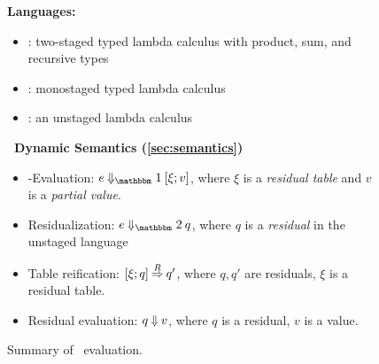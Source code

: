 
\begin{figure*}
\textbf{Languages:}
\begin{itemize}
\item \lang: two-staged typed lambda calculus with product, sum, and
  recursive types
\item \langTwo: monostaged typed lambda calculus
\item \langmono: an unstaged lambda calculus
\end{itemize}

\textbf{\lang\ Dynamic Semantics (\ref{sec:semantics})}
\begin{itemize}
\item 
\bbone-Evaluation: $e\mathbin{\redonesym}[\xi;v]$, where $\xi$ is a \emph{residual table} and $v$ is a \emph{partial value}. 

\item
Residualization: $e\mathbin{\redtwosym}q$, where $q$ is a \emph{residual} in the unstaged language \langTwo

\item 
Table reification: $[\xi;q]\mathbin{\overset{R}\Rightarrow} q'$, where $q,q'$ are residuals,
$\xi$ is a residual table.

\item
Residual evaluation: $q\mathbin{{\Downarrow}} v$, where $q$ is a residual, $v$ is a
value.
\end{itemize}

\caption{Summary of \lang\ evaluation.}
\label{fig:dynamicsSummary}
\end{figure*}

